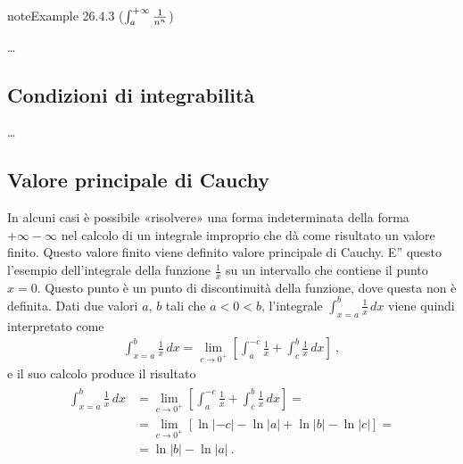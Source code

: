 \documentclass[letterpaper,10pt,italian]{jupyterBook}
\begin{document}
\label{ch/infinitesimal_calculus/integrals:integrals-fundamental-1xn-limit}
\begin{sphinxadmonition}{note}{Example 26.4.3 (\protect\(\int_{a}^{+\infty} \frac{1}{n^n}\protect\))}



\sphinxAtStartPar
…
\end{sphinxadmonition}


\subsection{Condizioni di integrabilità}
\label{\detokenize{ch/infinitesimal_calculus/integrals:condizioni-di-integrabilita}}
\sphinxAtStartPar
…


\subsection{Valore principale di Cauchy}
\label{\detokenize{ch/infinitesimal_calculus/integrals:valore-principale-di-cauchy}}\label{\detokenize{ch/infinitesimal_calculus/integrals:infinitesimal-calculus-integrals-improper-cauchy}}
\sphinxAtStartPar
In alcuni casi è possibile «risolvere» una forma indeterminata della forma \(+\infty - \infty\) nel calcolo di un integrale improprio che dà come risultato un valore finito. Questo valore finito viene definito valore principale di Cauchy. E” questo l’esempio dell’integrale della funzione \(\frac{1}{x}\) su un intervallo che contiene il punto \(x=0\). Questo punto è un punto di discontinuità della funzione, dove questa non è definita. Dati due valori \(a\), \(b\) tali che \(a < 0 < b\), l’integrale \(\int_{x=a}^{b} \frac{1}{x} \, dx\) viene quindi interpretato come
\begin{equation*}
\begin{split}\int_{x=a}^{b} \frac{1}{x} \, dx = \lim_{c \rightarrow 0^+} \left[ \int_{a}^{-c} \frac{1}{x} + \int_{c}^{b} \frac{1}{x} \, dx \right] \ ,\end{split}
\end{equation*}
\sphinxAtStartPar
e il suo calcolo produce il risultato
\begin{equation*}
\begin{split}\begin{aligned}
\int_{x=a}^{b} \frac{1}{x} \, dx 
 & = \lim_{c \rightarrow 0^+} \left[ \int_{a}^{-c} \frac{1}{x} + \int_{c}^{b} \frac{1}{x} \, dx \right] = \\ 
 & = \lim_{c \rightarrow 0^+} \left[ \ln|-c| - \ln|a| + \ln |b| - \ln|c| \right] = \\ 
 & = \ln |b| - \ln |a| \ .
\end{aligned}\end{split}
\end{equation*}
\end{document}
